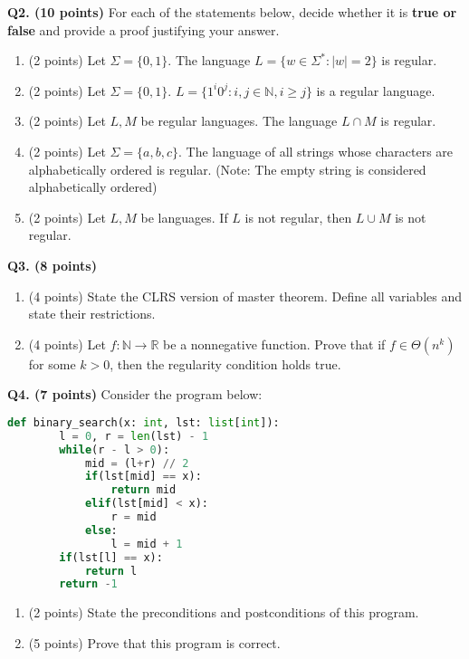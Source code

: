 \documentclass{article}
\begin{document}
    \pagebreak

    \noindent\textbf{Q2. (10 points)} For each of the statements below, decide whether it is \textbf{true or false} and provide a proof justifying your answer.

    \begin{enumerate}[label=\alph*)]
        \item (2 points) Let \(\Sigma = \{0, 1\}\). The language \(L = \{w \in \Sigma ^* : |w| = 2\}\) is regular.
        \vfill
        \item (2 points) Let \(\Sigma = \{0, 1\}\). \(L = \{1^{i}0^j : i,j \in \mathbb{N}, i \geq j\}\) is a regular language.
        \vfill
        \item (2 points) Let \(L, M\) be regular languages. The language \(L \cap M\) is regular.
        \vfill
        \pagebreak
        \item (2 points) Let \(\Sigma = \{a, b, c\}\). The language of all strings whose characters are alphabetically ordered is regular. (Note: The empty string is considered alphabetically ordered)
        \vfill
        \item (2 points) Let \(L, M\) be languages. If \(L\) is not regular, then \(L \cup M\) is not regular.
        \vfill
    \end{enumerate}

    \pagebreak

    \noindent\textbf{Q3. (8 points)}
    \begin{enumerate}[label=\alph*)]
        \item (4 points) State the CLRS version of master theorem. Define all variables and state their restrictions.
        \vfill
        \item (4 points) Let \(f: \mathbb{N} \to \mathbb{R}\) be a nonnegative function. Prove that if \(f \in \Theta (n^k)\) for some \(k > 0\), then the regularity condition holds true.
        \vfill
    \end{enumerate}

    \pagebreak

    \noindent\textbf{Q4. (7 points)} Consider the program below:
    \begin{lstlisting}[language=Python]
    def binary_search(x: int, lst: list[int]):
        l = 0, r = len(lst) - 1
        while(r - l > 0):
            mid = (l+r) // 2
            if(lst[mid] == x):
                return mid
            elif(lst[mid] < x):
                r = mid
            else:
                l = mid + 1
        if(lst[l] == x):
            return l
        return -1
    \end{lstlisting}
    \begin{enumerate}[label=\alph*)]
        \item (2 points) State the preconditions and postconditions of this program.
        \item (5 points) Prove that this program is correct.
    \end{enumerate}
    
\end{document}
